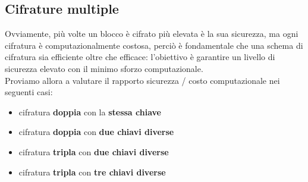 \subsection{Cifrature multiple}
Ovviamente, più volte un blocco è cifrato più elevata è la sua sicurezza, ma ogni cifratura è computazionalmente costosa, perciò è fondamentale che una schema di cifratura sia efficiente oltre che efficace: l'obiettivo è garantire un livello di sicurezza elevato con il minimo sforzo computazionale. \\
Proviamo allora a valutare il rapporto sicurezza / costo computazionale nei seguenti casi:
\begin{itemize}
\item cifratura \textbf{doppia} con la \textbf{stessa chiave}
\item cifratura \textbf{doppia} con \textbf{due chiavi diverse}
\item cifratura \textbf{tripla} con \textbf{due chiavi diverse}
\item cifratura \textbf{tripla} con \textbf{tre chiavi diverse}
\end{itemize}
